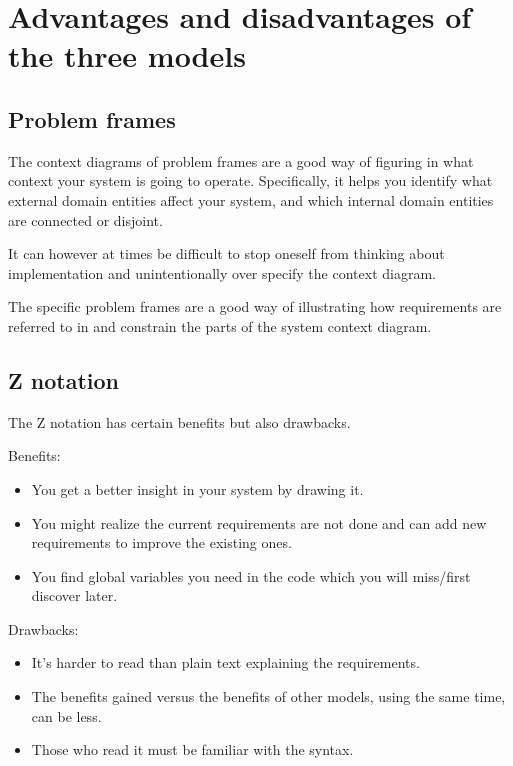 \documentclass[Main_Assignment2]{subfiles}
\begin{document}
\section{Advantages and disadvantages of the three models}

	\subsection{Problem frames} %
	\label{sub:problem_frames}

	The context diagrams of problem frames are a good way of figuring in what context your system is going to operate.
	Specifically, it helps you identify what external domain entities affect your system, and which internal domain entities are connected or disjoint.

	It can however at times be difficult to stop oneself from thinking about implementation and unintentionally over specify the context diagram.

	The specific problem frames are a good way of illustrating how requirements are referred to in and constrain the parts of the system context diagram.



	\subsection{Z notation}
	The Z notation has certain benefits but also drawbacks.

Benefits:
\vspace{-10pt}
\begin{itemize}
	\item You get a better insight in your system by drawing it.
	\item You might realize the current requirements are not done and can add new requirements to improve the existing ones.
	\item You find global variables you need in the code which you will miss/first discover later.
\end{itemize}

Drawbacks:
\vspace{-10pt}
\begin{itemize}
	\item It's harder to read than plain text explaining the requirements.
	\item The benefits gained versus the benefits of other models, using the same time, can be less.
	\item Those who read it must be familiar with the syntax.
\end{itemize}
\end{document}
